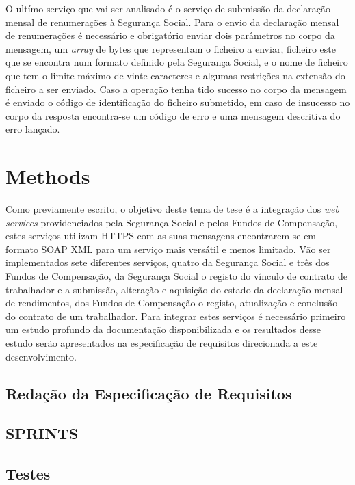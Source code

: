 \documentclass[sigplan]{acmart}
\begin{document}
O ultímo serviço que vai ser analisado é o serviço de submissão da declaração mensal de renumerações à Segurança Social. Para o envio da declaração mensal de renumerações é necessário e obrigatório enviar dois parâmetros no corpo da mensagem, um \textit{array} de bytes que representam o ficheiro a enviar, ficheiro este que se encontra num formato definido pela Segurança Social, e o nome de ficheiro que tem o limite máximo de vinte caracteres e algumas restrições na extensão do ficheiro a ser enviado. Caso a operação tenha tido sucesso no corpo da mensagem é enviado o código de identificação do ficheiro submetido, em caso de insucesso no corpo da resposta encontra-se um código de erro e uma mensagem descritiva do erro lançado.

\section{Methods} \label{sec:methods}

Como previamente escrito, o objetivo deste tema de tese é a integração dos \textit{web services} providenciados pela Segurança Social e pelos Fundos de Compensação, estes serviços utilizam HTTPS com as suas mensagens encontrarem-se em formato SOAP XML para um serviço mais versátil e menos limitado. Vão ser implementados sete diferentes serviços, quatro da Segurança Social e três dos Fundos de Compensação, da Segurança Social o registo do vínculo de contrato de trabalhador e a submissão, alteração e aquisição do estado da declaração mensal de rendimentos, dos Fundos de Compensação o registo, atualização e conclusão do contrato de um trabalhador. Para integrar estes serviços é necessário primeiro um estudo profundo da documentação disponibilizada e os resultados desse estudo serão apresentados na especificação de requisitos direcionada a este desenvolvimento.

\subsection{Redação da Especificação de Requisitos}

\subsection{SPRINTS}

\subsection{Testes}
\end{document}
